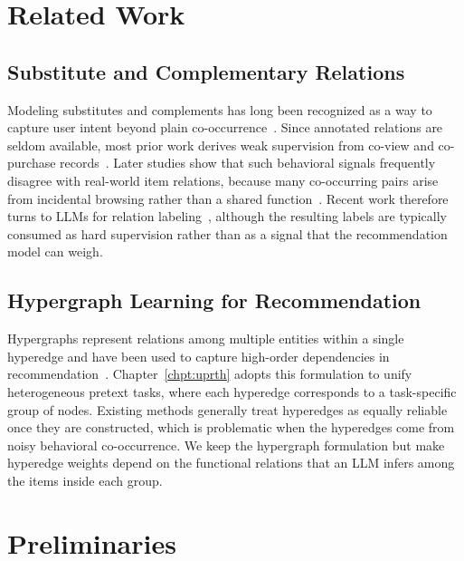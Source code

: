 \section{Related Work}
\subsection{Substitute and Complementary Relations}
Modeling substitutes and complements has long been recognized as a way to capture user intent beyond plain co-occurrence~\cite{subcom22, subcom23}. Since annotated relations are seldom available, most prior work derives weak supervision from co-view and co-purchase records~\cite{sclabel20chen, sclabel20liu, sclabel20xu}. Later studies show that such behavioral signals frequently disagree with real-world item relations, because many co-occurring pairs arise from incidental browsing rather than a shared function~\cite{notrealsc22tong, notrealsc23ye, notrealsc24kai}. Recent work therefore turns to LLMs for relation labeling~\cite{llmlabel23papso, llmlabel25Hosseini}, although the resulting labels are typically consumed as hard supervision rather than as a signal that the recommendation model can weigh.

\subsection{Hypergraph Learning for Recommendation}
Hypergraphs represent relations among multiple entities within a single hyperedge and have been used to capture high-order dependencies in recommendation~\cite{hccf}. Chapter~\ref{chpt:uprth} adopts this formulation to unify heterogeneous pretext tasks, where each hyperedge corresponds to a task-specific group of nodes. Existing methods generally treat hyperedges as equally reliable once they are constructed, which is problematic when the hyperedges come from noisy behavioral co-occurrence. We keep the hypergraph formulation but make hyperedge weights depend on the functional relations that an LLM infers among the items inside each group.

\section{Preliminaries}\label{sec_erlsc:pre}

